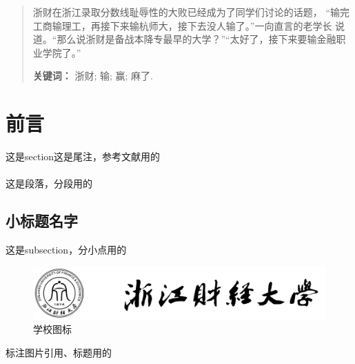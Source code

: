 \documentclass[12pt, a4paper, oneside, fontset=windows]{ctexart}
\begin{document}
\begin{titlepage}
\begin{spacing}{1.3}
      \hspace{27mm}\LARGE{}

      \hspace{27mm}\LARGE{}
        
    \end{spacing}
  
    \vspace{25mm}
  
  \end{titlepage}


\maketitle
\setcounter{page}{0}
\maketitle
\thispagestyle{empty}

\begin{abstract}
    \kaishu 浙财在浙江录取分数线耻辱性的大败已经成为了同学们讨论的话题，
    “输完工商输理工，再接下来输杭师大，接下去没人输了。”一向直言的老学长
    说道。“那么说浙财是备战本降专最早的大学？”“太好了，接下来要输金融职业学院了。”
    \par\textbf{关键词：} \heiti 浙财; 输; 赢; 麻了. 
\end{abstract}

\newpage
{}
\tableofcontents
\newpage


\section{前言}
这是section\cite{ref1}这是尾注，参考文献用的

\paragraph{}
这是段落，分段用的

\subsection{小标题名字}
这是subsection，分小点用的

\begin{figure}[H]
    \centering
    \includegraphics[scale=0.6]{title.png}
    \caption{学校图标\protect\footnotemark}
    \end{figure} 
标注图片引用、标题用的
\end{document}
